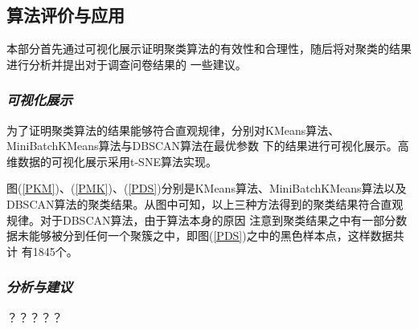 \documentclass{acm_proc_article-sp}
\begin{document}



\subsection{\textsf{算法评价与应用}}
本部分首先通过可视化展示证明聚类算法的有效性和合理性，随后将对聚类的结果进行分析并提出对于调查问卷结果的
一些建议。

\subsubsection{\textit{可视化展示}}
为了证明聚类算法的结果能够符合直观规律，分别对KMeans算法、MiniBatchKMeans算法与DBSCAN算法在最优参数
下的结果进行可视化展示。高维数据的可视化展示采用t-SNE算法实现。



图(\ref{PKM})、(\ref{PMK})、(\ref{PDS})分别是KMeans算法、MiniBatchKMeans算法以及
DBSCAN算法的聚类结果。从图中可知，以上三种方法得到的聚类结果符合直观规律。对于DBSCAN算法，由于算法本身的原因
注意到聚类结果之中有一部分数据未能够被分到任何一个聚簇之中，即图(\ref{PDS})之中的黑色样本点，这样数据共计
有1845个。

\subsubsection{\textit{分析与建议}}
？？？？？



%
%
\newpage
\appendix
\end{document}
